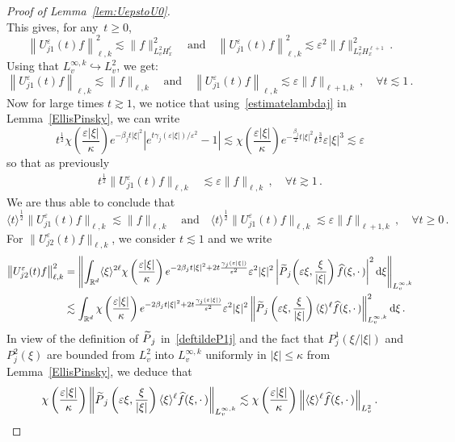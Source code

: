 \documentclass[11pt]{article}
\theoremstyle{definition}
\numberwithin{equation}{section}
\numberwithin{figure}{section}
\numberwithin{table}{section}
\newcommand*{\dd}{\mathrm{d}}
\newcommand*{\dxi}{\dd \xi}
\newcommand*\R {\mathbb{R}}
\newcommand*\eps{{\varepsilon}}
\let\oldforall\forall
\renewcommand*{\forall}{\mathrel{\oldforall}}
\let\oldtilde\tilde
\renewcommand*{\tilde}[1]{\mathchoice{\widetilde{#1}}{\widetilde{#1}}{\oldtilde{#1}}{\oldtilde{#1}}}
\begin{document}
\begin{proof}[Proof of Lemma~\ref{lem:UepstoU0}]
\begin{equation}
\end{equation}
This gives, for any~$t\geq 0$,
\[
\left\|U^\eps_{j1}(t)f\right\|_{\ell,k} ^2\lesssim \|f\|_{L^2_v H^{\ell}_x }^2 \quad \text{and} \quad \left\|U^\eps_{j1}(t)f \right\|_{\ell,k} ^2 \lesssim \eps^2 \|f\|^2_{L^2_vH^{\ell+1}_x} \,.
\]
Using that $ L^{\infty,k}_v \hookrightarrow L^2_v$, we get:
\[
\left\|U^\eps_{j1}(t)f\right\|_{\ell,k} \lesssim \|f\|_{\ell,k} \quad \text{and} \quad \left\|U^\eps_{j1}(t)f\right\|_{\ell,k} \lesssim \eps \|f\|_{\ell+1,k} \,, \quad \forall t \lesssim 1\,.
\]
Now for large times $t \gtrsim 1$, we notice that using~\eqref{estimatelambdaj} in Lemma~\ref{EllisPinsky}, we can write
\[
t^{\frac12}\chi\left(\frac{\eps|\xi|}\kappa\right) e^{- \beta_j t |\xi|^2} \left|e^{t \gamma_j(\eps|\xi|)/\eps^2}-1 \right| \lesssim \chi\left (\frac{\eps|\xi|}\kappa\right) e^{- \frac{\beta_j }2 t |\xi|^2} t^{\frac 32} \eps |\xi|^3 \lesssim \eps
\]
so that as previously
\begin{align*}
t^{\frac 12} \|U^\eps_{j1}(t)f\|_{\ell,k} &\lesssim \eps \|f\|_{\ell,k}\,, \quad \forall t \gtrsim 1\,.
\end{align*}
We are thus able to conclude that
\[
\langle t \rangle^{\frac 12} \|U^\eps_{j1}(t)f\|_{{\ell,k}} \lesssim \|f\|_{\ell,k} \quad \text{and} \quad \langle t \rangle^\frac12 \|U^\eps_{j1}(t)f\|_{\ell,k} \lesssim \eps \|f\|_{\ell+1,k}\,,\quad \forall t \ge 0 \,.
\]
For $\|U^\eps_{j2}(t)f\|_{\ell,k}$, we consider $t \lesssim 1$ and we write
\begin{align*}
\left\|U^\eps_{j2}(t)f\right\|_{\ell,k}^2
&=\left\| \int_{\R^d} \langle \xi \rangle^{2\ell} \chi \left(\frac{\eps|\xi|}\kappa\right) e^{- 2\beta_j t |\xi|^2+ 2t \frac{\gamma_j(\eps|\xi|)}{\eps^2}} \eps^2 |\xi|^2 \left|\tilde P_{j}\!\left(\eps \xi,\frac{\xi}{|\xi|}\right)\widehat{f}(\xi,\cdot\,)\right|^2 \dxi\right\|_{L^{\infty,k}_v} \\
&\lesssim \int_{\R^d} \chi\left(\frac{\eps|\xi|}\kappa\right) e^{- 2\beta_j t |\xi|^2+ 2t \frac{\gamma_j(\eps|\xi|)}{\eps^2}} \eps^2 |\xi|^2 \left\|\tilde P_{j}\left(\eps \xi,\frac{\xi}{|\xi|}\right) \langle \xi \rangle^{\ell} \widehat{f}(\xi,\cdot\,)\right\|_{L^{\infty,k}_v}^2 \dxi \,.
\end{align*}
In view of the definition of $\tilde P_{j}$ in~\eqref{deftildeP1j} and the fact that $P_{j}^1(\xi/|\xi|)$ and $P_{j}^2(\xi)$ are bounded from $L^2_v$ into $L^{\infty,k}_v$ uniformly in $|\xi| \le \kappa$ from Lemma~\ref{EllisPinsky}, we deduce that
\[
\chi\left(\frac{\eps|\xi|}\kappa\right) \left\|\tilde P_{j}\left(\eps \xi,\frac{\xi}{|\xi|}\right) \langle \xi \rangle^{\ell}\widehat{f}(\xi,\cdot\,)\right\|_{L^{\infty,k}_v} \lesssim \chi\left (\frac{\eps|\xi|}\kappa\right) \Big\| \langle \xi \rangle^{\ell}\widehat{f}(\xi,\cdot\,)\Big\|_{L^2_v} \,.
\]
\end{proof}
\end{document}
